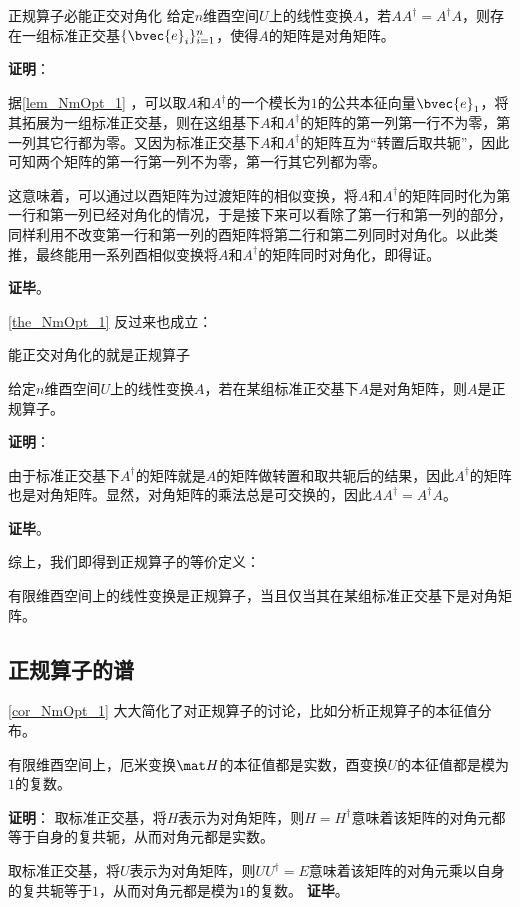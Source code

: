 \begin{theorem}{正规算子必能正交对角化}\label{the_NmOpt_1}
给定$n$维酉空间$U$上的线性变换$A$，若$AA^\dagger = A^\dagger A$，则存在一组标准正交基$\{\bvec{e}_i\}_{i=1}^n$，使得$A$的矩阵是对角矩阵。
\end{theorem}

\textbf{证明}：

据\autoref{lem_NmOpt_1} ，可以取$A$和$A^\dagger$的一个模长为$1$的公共本征向量$\bvec{e}_1$，将其拓展为一组标准正交基，则在这组基下$A$和$A^\dagger$的矩阵的第一列第一行不为零，第一列其它行都为零。又因为标准正交基下$A$和$A^\dagger$的矩阵互为“转置后取共轭”，因此可知两个矩阵的第一行第一列不为零，第一行其它列都为零。

这意味着，可以通过以酉矩阵为过渡矩阵的相似变换，将$A$和$A^\dagger$的矩阵同时化为第一行和第一列已经对角化的情况，于是接下来可以看除了第一行和第一列的部分，同样利用不改变第一行和第一列的酉矩阵将第二行和第二列同时对角化。以此类推，最终能用一系列酉相似变换将$A$和$A^\dagger$的矩阵同时对角化，即得证。

\textbf{证毕}。


\autoref{the_NmOpt_1} 反过来也成立：


\begin{theorem}{能正交对角化的就是正规算子}

给定$n$维酉空间$U$上的线性变换$A$，若在某组标准正交基下$A$是对角矩阵，则$A$是正规算子。

\end{theorem}

\textbf{证明}：

由于标准正交基下$A^\dagger$的矩阵就是$A$的矩阵做转置和取共轭后的结果，因此$A^\dagger$的矩阵也是对角矩阵。显然，对角矩阵的乘法总是可交换的，因此$AA^\dagger = A^\dagger A$。

\textbf{证毕}。


综上，我们即得到正规算子的等价定义：


\begin{corollary}{}
有限维酉空间上的线性变换是正规算子，当且仅当其在某组标准正交基下是对角矩阵。
\end{corollary}

\subsection{正规算子的谱}
\autoref{cor_NmOpt_1} 大大简化了对正规算子的讨论，比如分析正规算子的本征值分布。

\begin{theorem}{}
有限维酉空间上，厄米变换$\mat H$的本征值都是实数，酉变换$U$的本征值都是模为$1$的复数。
\end{theorem}

\textbf{证明}：
取标准正交基，将$H$表示为对角矩阵，则$H=H^\dagger$意味着该矩阵的对角元都等于自身的复共轭，从而对角元都是实数。

取标准正交基，将$U$表示为对角矩阵，则$UU^\dagger = E$意味着该矩阵的对角元乘以自身的复共轭等于$1$，从而对角元都是模为$1$的复数。
\textbf{证毕}。
